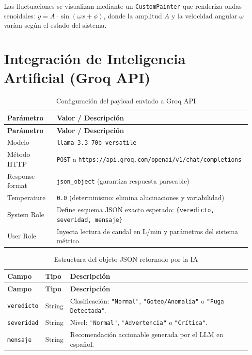 \documentclass[12pt,a4paper]{article}
\begin{document}
Las fluctuaciones se visualizan mediante un \texttt{CustomPainter} que renderiza ondas
senoidales: $y = A \cdot \sin(\omega x + \phi)$, donde la amplitud $A$ y la velocidad
angular $\omega$ varían según el estado del sistema.

\section{Integración de Inteligencia Artificial (Groq API)}

\begin{longtable}{p{4cm} p{9.5cm}}
\caption{Configuración del payload enviado a Groq API} \label{tab:groq-payload} \\
\toprule
\textbf{Parámetro} & \textbf{Valor / Descripción} \\
\midrule
\endfirsthead
\toprule
\textbf{Parámetro} & \textbf{Valor / Descripción} \\
\midrule
\endhead
\bottomrule
\endlastfoot
Modelo & \texttt{llama-3.3-70b-versatile} \\
Método HTTP & \texttt{POST} a \texttt{https://api.groq.com/openai/v1/chat/completions} \\
Response format & \texttt{json\_object} (garantiza respuesta parseable) \\
Temperature & \texttt{0.0} (determinismo: elimina alucinaciones y variabilidad) \\
System Role & Define esquema JSON exacto esperado: \texttt{\{veredicto, severidad, mensaje\}} \\
User Role & Inyecta lectura de caudal en L/min y parámetros del sistema métrico \\
\end{longtable}

\begin{longtable}{p{3cm} p{3cm} p{7.5cm}}
\caption{Estructura del objeto JSON retornado por la IA} \label{tab:json-ia} \\
\toprule
\textbf{Campo} & \textbf{Tipo} & \textbf{Descripción} \\
\midrule
\endfirsthead
\toprule
\textbf{Campo} & \textbf{Tipo} & \textbf{Descripción} \\
\midrule
\endhead
\bottomrule
\endlastfoot
\texttt{veredicto} & String & Clasificación: \texttt{"Normal"}, \texttt{"Goteo/Anomalía"} o \texttt{"Fuga Detectada"}. \\
\texttt{severidad} & String & Nivel: \texttt{"Normal"}, \texttt{"Advertencia"} o \texttt{"Crítica"}. \\
\texttt{mensaje}   & String & Recomendación accionable generada por el LLM en español. \\
\end{longtable}
\end{document}
